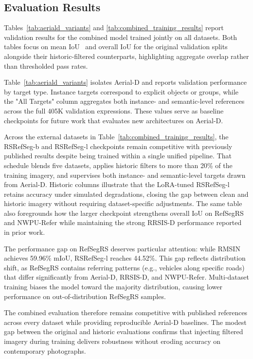 \subsection{Evaluation Results}
\label{subsec:evaluation_results}

Tables~\ref{tab:aeriald_variants} and \ref{tab:combined_training_results} report validation results for the combined model trained jointly on all datasets. Both tables focus on mean IoU~\cite{everingham2010pascal} and overall IoU for the original validation splits alongside their historic-filtered counterparts, highlighting aggregate overlap rather than thresholded pass rates.

Table~\ref{tab:aeriald_variants} isolates Aerial-D and reports validation performance by target type. Instance targets correspond to explicit objects or groups, while the "All Targets" column aggregates both instance- and semantic-level references across the full 405K validation expressions. These values serve as baseline checkpoints for future work that evaluates new architectures on Aerial-D.

Across the external datasets in Table~\ref{tab:combined_training_results}, the RSRefSeg-b and RSRefSeg-l checkpoints remain competitive with previously published results despite being trained within a single unified pipeline. That schedule blends five datasets, applies historic filters to more than 20\% of the training imagery, and supervises both instance- and semantic-level targets drawn from Aerial-D. Historic columns illustrate that the LoRA-tuned RSRefSeg-l retains accuracy under simulated degradations, closing the gap between clean and historic imagery without requiring dataset-specific adjustments. The same table also foregrounds how the larger checkpoint strengthens overall IoU on RefSegRS and NWPU-Refer while maintaining the strong RRSIS-D performance reported in prior work.

The performance gap on RefSegRS deserves particular attention: while RMSIN achieves 59.96\% mIoU, RSRefSeg-l reaches 44.52\%. This gap reflects distribution shift, as RefSegRS contains referring patterns (e.g., vehicles along specific roads) that differ significantly from Aerial-D, RRSIS-D, and NWPU-Refer. Multi-dataset training biases the model toward the majority distribution, causing lower performance on out-of-distribution RefSegRS samples.

The combined evaluation therefore remains competitive with published references across every dataset while providing reproducible Aerial-D baselines. The modest gap between the original and historic evaluations confirms that injecting filtered imagery during training delivers robustness without eroding accuracy on contemporary photographs.

